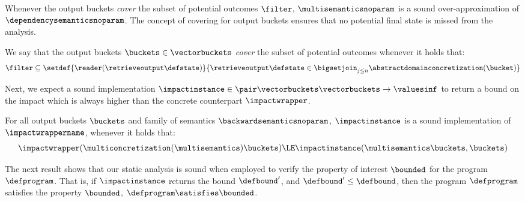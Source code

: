 Whenever the output buckets \textit{cover} the subset of potential outcomes $\filter$, $\multisemanticsnoparam$ is a sound over-approximation of $\dependencysemanticsnoparam$.
The concept of covering for output buckets ensures that no potential final state is missed from the analysis.

\begin{definition}[Covering]\label{def:covering}
  We say that the output buckets $\buckets\in\vectorbuckets$ \textit{cover} the subset of potential outcomes whenever it holds that:
  \[\filter\subseteq \setdef{\reader(\retrieveoutput\defstate)}{\retrieveoutput\defstate\in\bigsetjoin_{j\le n}\abstractdomainconcretization(\bucket)}\]
\end{definition}


Next, we expect a sound implementation $\impactinstance\in\pair\vectorbuckets\vectorbuckets\to\valuesinf$ to return a bound on the impact which is always higher than the concrete counterpart $\impactwrapper$.

\begin{definition}
  For all output buckets $\buckets$ and family of semantics $\backwardsemanticsnoparam$, $\impactinstance$ is a \textup{sound implementation} of $\impactwrappername$, whenever it holds that:
  \[
    \impactwrapper(
      \multiconcretization(\multisemantics)\buckets
    ) \LE \impactinstance(\multisemantics\buckets, \buckets)
  \]
\end{definition}



The next result shows that our static analysis is sound when employed to verify the property of interest $\bounded$ for the program $\defprogram$.
That is, if %
$\impactinstance$ returns the bound $\defbound'$, and $\defbound'\le\defbound$, then the program $\defprogram$ satisfies the property $\bounded$, \cf{} $\defprogram \satisfies \bounded$.


